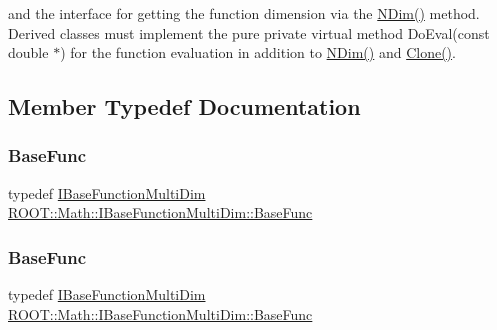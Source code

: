 and the interface for getting the function dimension via the \mbox{\hyperlink{classROOT_1_1Math_1_1IBaseFunctionMultiDim_a16f37dc7a6d00c75ddeda0697741315d}{N\+Dim()}} method. Derived classes must implement the pure private virtual method Do\+Eval(const double $\ast$) for the function evaluation in addition to \mbox{\hyperlink{classROOT_1_1Math_1_1IBaseFunctionMultiDim_a16f37dc7a6d00c75ddeda0697741315d}{N\+Dim()}} and \mbox{\hyperlink{classROOT_1_1Math_1_1IBaseFunctionMultiDim_a57939204b1f525b43835b42e0635dd3b}{Clone()}}. 

\subsection{Member Typedef Documentation}
\mbox{\label{classROOT_1_1Math_1_1IBaseFunctionMultiDim_a44c87c3e8c23d140cc3bf067d6480070}} 
\subsubsection{\texorpdfstring{BaseFunc}{BaseFunc}\hspace{0.1cm}{\footnotesize\ttfamily [1/2]}}
{\footnotesize\ttfamily typedef \mbox{\hyperlink{classROOT_1_1Math_1_1IBaseFunctionMultiDim}{I\+Base\+Function\+Multi\+Dim}} \mbox{\hyperlink{classROOT_1_1Math_1_1IBaseFunctionMultiDim_a44c87c3e8c23d140cc3bf067d6480070}{R\+O\+O\+T\+::\+Math\+::\+I\+Base\+Function\+Multi\+Dim\+::\+Base\+Func}}}

\mbox{\label{classROOT_1_1Math_1_1IBaseFunctionMultiDim_a44c87c3e8c23d140cc3bf067d6480070}} 
\subsubsection{\texorpdfstring{BaseFunc}{BaseFunc}\hspace{0.1cm}{\footnotesize\ttfamily [2/2]}}
{\footnotesize\ttfamily typedef \mbox{\hyperlink{classROOT_1_1Math_1_1IBaseFunctionMultiDim}{I\+Base\+Function\+Multi\+Dim}} \mbox{\hyperlink{classROOT_1_1Math_1_1IBaseFunctionMultiDim_a44c87c3e8c23d140cc3bf067d6480070}{R\+O\+O\+T\+::\+Math\+::\+I\+Base\+Function\+Multi\+Dim\+::\+Base\+Func}}}




